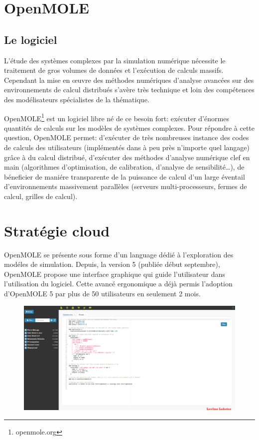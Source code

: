 \documentclass[10pt,a4paper]{article}
\begin{document}
\section{OpenMOLE}

\subsection{Le logiciel}

L'étude des systèmes complexes par la simulation numérique nécessite le traitement de gros volumes de données et l’exécution de calculs massifs. Cependant la mise en œuvre des méthodes numériques d'analyse avancées sur des environnements de calcul distribués s’avère très technique et loin des compétences des modélisateurs spécialistes de la thématique.

OpenMOLE\footnote{openmole.org} est un logiciel libre né de ce besoin fort: exécuter d'énormes quantités de calculs sur les modèles de systèmes complexes. Pour répondre à cette question, OpenMOLE permet: d’exécuter de très nombreuses instance des codes de calculs des utilisateurs (implémentés dans à peu près n'importe quel langage) grâce à du calcul distribué, d’exécuter des méthodes d'analyse numérique clef en main (algorithmes d'optimisation, de calibration, d'analyse de sensibilité…), de béneficier de maniére transparente de la puissance de calcul d'un large éventail d'environnements massivement parallèles  (serveurs multi-processeurs, fermes de calcul, grilles de calcul).


\section{Stratégie cloud}

OpenMOLE se présente sous forme d'un language dédié à l'exploration des modéles de simulation. Depuis, la version 5 (publiée début septembre), OpenMOLE propose une interface graphique qui guide l'utilisateur dans l'utilisation du logiciel. Cette avancé ergonomique a déjà permis l'adoption d'OpenMOLE 5 par plus de 50 utilisateurs en seulement 2 mois. 

\begin{figure}[h]
 \centering
  \includegraphics[width=0.8\linewidth]{img/openmoleUI.png}
\end{figure}
\end{document}

